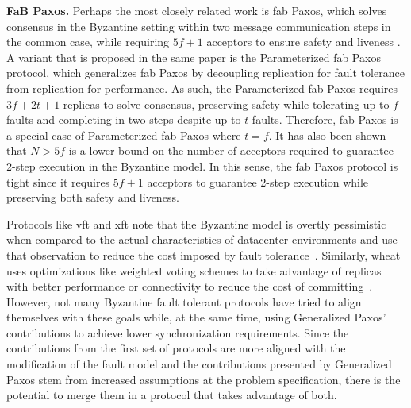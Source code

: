 \textbf{FaB Paxos.} Perhaps the most closely related work is \acrfull{fab} Paxos, which solves consensus in the Byzantine setting within two message communication steps in the common case, while requiring $5f+1$ acceptors to ensure safety and liveness \cite{Martin2006}. A variant that is proposed in the same paper is the Parameterized \acrshort{fab} Paxos protocol, which generalizes \acrshort{fab} Paxos by decoupling replication for fault tolerance from replication for performance. As such, the Parameterized \acrshort{fab} Paxos requires $3f+2t+1$ replicas to solve consensus, preserving safety while tolerating up to $f$ faults and completing in two steps despite up to $t$ faults. Therefore, \acrshort{fab} Paxos is a special case of Parameterized \acrshort{fab} Paxos where $t=f$. It has also been shown that $N>5f$ is a lower bound on the number of acceptors required to guarantee 2-step execution in the Byzantine model. In this sense, the \acrshort{fab} Paxos protocol is tight since it requires $5f+1$ acceptors to guarantee 2-step execution while preserving both safety and liveness. \par
Protocols like \acrshort{vft} and \acrshort{xft} note that the Byzantine model is overtly pessimistic when compared to the actual characteristics of datacenter environments and use that observation to reduce the cost imposed by fault tolerance~\cite{Porto2015,Liu2015}. Similarly, \acrshort{wheat} uses optimizations like weighted voting schemes to take advantage of replicas with better performance or connectivity to reduce the cost of committing~\cite{Sousa2016}. However, not many Byzantine fault tolerant protocols have tried to align themselves with these goals while, at the same time, using Generalized Paxos' contributions to achieve lower synchronization requirements. Since the contributions from the first set of protocols are more aligned with the modification of the fault model and the contributions presented by Generalized Paxos stem from increased assumptions at the problem specification, there is the potential to merge them in a protocol that takes advantage of both.

